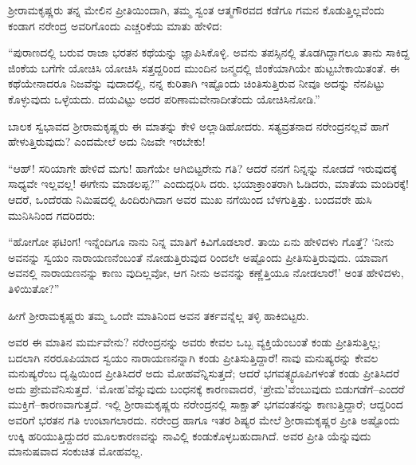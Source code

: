 ಶ್ರೀರಾಮಕೃಷ್ಣರು ತನ್ನ ಮೇಲಿನ ಪ್ರೀತಿಯಿಂದಾಗಿ, ತಮ್ಮ ಸ್ವಂತ ಆತ್ಮಗೌರವದ ಕಡೆಗೂ ಗಮನ ಕೊಡುತ್ತಿಲ್ಲವೆಂದು ಕಂಡಾಗ ನರೇಂದ್ರ ಅವರಿಗೊಂದು ಎಚ್ಚರಿಕೆಯ ಮಾತು ಹೇಳಿದ:

“ಪುರಾಣದಲ್ಲಿ ಬರುವ ರಾಜಾ ಭರತನ ಕಥೆಯನ್ನು ಜ್ಞಾಪಿಸಿಕೊಳ್ಳಿ. ಅವನು ತಪಸ್ಸಿನಲ್ಲಿ ತೊಡಗಿದ್ದಾಗಲೂ ತಾನು ಸಾಕಿದ್ದ ಜಿಂಕೆಯ ಬಗೆಗೇ ಯೋಚಿಸಿ ಯೋಚಿಸಿ ಸತ್ತದ್ದರಿಂದ ಮುಂದಿನ ಜನ್ಮದಲ್ಲಿ ಜಿಂಕೆಯಾಗಿಯೇ ಹುಟ್ಟಬೇಕಾಯಿತಂತೆ. ಈ ಕಥೆಯೇನಾದರೂ ನಿಜವೆನ್ನು ವುದಾದಲ್ಲಿ, ನನ್ನ ಕುರಿತಾಗಿ ಇಷ್ಟೊಂದು ಚಿಂತಿಸುತ್ತಿರುವ ನೀವೂ ಅದನ್ನು ನೆನಪಿಟ್ಟು ಕೊಳ್ಳುವುದು ಒಳ್ಳೆಯದು. ದಯವಿಟ್ಟು ಅದರ ಪರಿಣಾಮವೇನಾದೀತೆಂದು ಯೋಚಿಸಿನೋಡಿ.”

ಬಾಲಕ ಸ್ವಭಾವದ ಶ್ರೀರಾಮಕೃಷ್ಣರು ಈ ಮಾತನ್ನು ಕೇಳಿ ಅಲ್ಲಾಡಿಹೋದರು. ಸತ್ಯವ್ರತನಾದ ನರೇಂದ್ರನಲ್ಲವೆ ಹಾಗೆ ಹೇಳುತ್ತಿರುವುದು? ಎಂದಮೇಲೆ ಅದು ನಿಜವೇ ಇರಬೇಕು!

“ಆಹ್! ಸರಿಯಾಗೇ ಹೇಳಿದೆ ಮಗು! ಹಾಗೆಯೇ ಆಗಿಬಿಟ್ಟರೇನು ಗತಿ? ಆದರೆ ನನಗೆ ನಿನ್ನನ್ನು ನೋಡದೆ ಇರುವುದಕ್ಕೆ ಸಾಧ್ಯವೇ ಇಲ್ಲವಲ್ಲ! ಈಗೇನು ಮಾಡಲಪ್ಪ?” ಎಂದುದ್ಗರಿಸಿ ದರು. ಭಯಾಕ್ರಾಂತರಾಗಿ ಓಡಿದರು, ಮಾತೆಯ ಮಂದಿರಕ್ಕೆ! ಆದರೆ, ಒಂದೆರಡು ನಿಮಿಷದಲ್ಲಿ ಹಿಂದಿರುಗಿದಾಗ ಅವರ ಮುಖ ನಗೆಯಿಂದ ಬೆಳಗುತ್ತಿತ್ತು. ಬಂದವರೇ ಹುಸಿ ಮುನಿಸಿನಿಂದ ಗದರಿದರು:

“ಹೋಗೋ ಫಟಿಂಗ! ಇನ್ನೆಂದಿಗೂ ನಾನು ನಿನ್ನ ಮಾತಿಗೆ ಕಿವಿಗೊಡಲಾರೆ. ತಾಯಿ ಏನು ಹೇಳಿದಳು ಗೊತ್ತೆ? ‘ನೀನು ಅವನನ್ನು ಸ್ವಯಂ ನಾರಾಯಣನೆಂಬಂತೆ ನೋಡುತ್ತಿರುವುದ ರಿಂದಲೇ ಅಷ್ಟೊಂದು ಪ್ರೀತಿಸುತ್ತಿರುವುದು. ಯಾವಾಗ ಅವನಲ್ಲಿ ನಾರಾಯಣನನ್ನು ಕಾಣು ವುದಿಲ್ಲವೋ, ಆಗ ನೀನು ಅವನನ್ನು ಕಣ್ಣೆತ್ತಿಯೂ ನೋಡಲಾರೆ!’ ಅಂತ ಹೇಳಿದಳು, ತಿಳಿಯಿತೋ?”

ಹೀಗೆ ಶ್ರೀರಾಮಕೃಷ್ಣರು ತಮ್ಮ ಒಂದೇ ಮಾತಿನಿಂದ ಅವನ ತರ್ಕವನ್ನೆಲ್ಲ ತಳ್ಳಿ ಹಾಕಿಬಿಟ್ಟರು.

ಅವರ ಈ ಮಾತಿನ ಮರ್ಮವೇನು? ನರೇಂದ್ರನನ್ನು ಅವರು ಕೇವಲ ಒಬ್ಬ ವ್ಯಕ್ತಿಯೆಂಬಂತೆ ಕಂಡು ಪ್ರೀತಿಸುತ್ತಿಲ್ಲ; ಬದಲಾಗಿ ನರರೂಪಿಯಾದ ಸ್ವಯಂ ನಾರಾಯಣನನ್ನಾಗಿ ಕಂಡು ಪ್ರೀತಿಸುತ್ತಿದ್ದಾರೆ! ನಾವು ಮನುಷ್ಯರನ್ನು ಕೇವಲ ಮನುಷ್ಯರೆಂಬ ದೃಷ್ಟಿಯಿಂದ ಪ್ರೀತಿಸಿದರೆ ಅದು ಮೋಹವೆನ್ನಿಸುತ್ತದೆ; ಆದರೆ ಭಗವತ್ಸ್ವರೂಪಿಗಳಂತೆ ಕಂಡು ಪ್ರೀತಿಸಿದರೆ ಅದು ಪ್ರೇಮವೆನಿಸುತ್ತದೆ. ‘ಮೋಹ’ವೆನ್ನುವುದು ಬಂಧನಕ್ಕೆ ಕಾರಣವಾದರೆ, ‘ಪ್ರೇಮ’ವೆಂಬುವುದು ಬಿಡುಗಡೆಗೆ–ಎಂದರೆ ಮುಕ್ತಿಗೆ–ಕಾರಣವಾಗುತ್ತದೆ. ಇಲ್ಲಿ ಶ್ರೀರಾಮಕೃಷ್ಣರು ನರೇಂದ್ರನಲ್ಲಿ ಸಾಕ್ಷಾತ್ ಭಗವಂತನನ್ನು ಕಾಣುತ್ತಿದ್ದಾರೆ; ಆದ್ದರಿಂದ ಅವರಿಗೆ ಭರತನ ಗತಿ ಉಂಟಾಗಲಾರದು. ನರೇಂದ್ರ ಹಾಗೂ ಇತರ ಶಿಷ್ಯರ ಮೇಲೆ ಶ್ರೀರಾಮಕೃಷ್ಣರ ಪ್ರೀತಿ ಅಷ್ಟೊಂದು ಉಕ್ಕಿ ಹರಿಯುತ್ತಿದ್ದುದರ ಮೂಲಕಾರಣವನ್ನು ನಾವಿಲ್ಲಿ ಕಂಡುಕೊಳ್ಳಬಹುದಾಗಿದೆ. ಅವರ ಪ್ರೀತಿ ಯೆನ್ನುವುದು ಮಾನುಷವಾದ ಸಂಕುಚಿತ ಮೋಹವಲ್ಲ.


